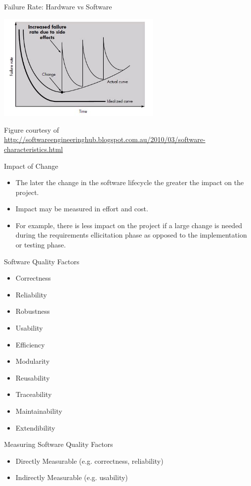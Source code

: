 \documentclass[aspectratio=1610,xcolor=dvipsnames,t,compress]{beamer}
\begin{document}
\begin{frame}{Failure Rate: Hardware vs Software} 
    \begin{block}{}
        \begin{center} 
        \includegraphics[width=0.6\textwidth]{images/failure-rates} 
        \end{center} 
    \end{block} 
    \tiny{Figure courtesy of \url{http://softwareengineeringhub.blogspot.com.au/2010/03/software-characteristics.html}}
\end{frame} 

\begin{frame}{Impact of Change}
    \begin{itemize}
        \item The later the change in the software lifecycle the greater the
            impact on the project.
        \item Impact may be measured in effort and cost.
        \item For example, there is less impact on the project if a large
            change is needed during the requirements ellicitation phase as
            opposed to the implementation or testing phase. 
    \end{itemize} 
\end{frame}

\begin{frame}{Software Quality Factors} 
    \begin{itemize}
        \item Correctness
        \item Reliability
        \item Robustness
        \item Usability
        \item Efficiency
        \item Modularity
        \item Reusability
        \item Traceability
        \item Maintainability
        \item Extendibility
    \end{itemize}
    \begin{block}{Measuring Software Quality Factors}
        \begin{itemize}
            \item Directly Measurable (e.g. correctness, reliability)
            \item Indirectly Measurable (e.g. usability)
        \end{itemize}
    \end{block} 
\end{frame}
\end{document}
